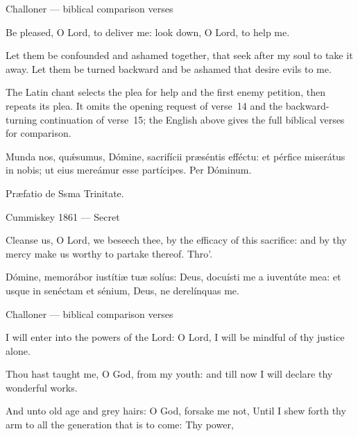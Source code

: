 \finishfulltextelement

\begin{fulltextenglish}{Challoner --- biblical comparison verses}

Be pleased, O Lord, to deliver me: look down, O Lord, to help me.

Let them be confounded and ashamed together, that seek after my soul to take it away. Let them be turned backward and be ashamed that desire evils to me.

\end{fulltextenglish}

The Latin chant selects the plea for help and the first enemy petition, then repeats its plea. It omits the opening request of verse~14 and the backward-turning continuation of verse~15; the English above gives the full biblical verses for comparison.



Munda nos, quǽsumus, Dómine, sacrifícii præséntis efféctu: et pérfice
miserátus in nobis; ut eius mereámur esse partícipes. Per Dóminum.

Præfatio de Ssma Trinitate.

\finishfulltextelement

\begin{fulltextenglish}{Cummiskey 1861 --- Secret}

Cleanse us, O Lord, we beseech thee, by the efficacy of this sacrifice: and by thy mercy make us worthy to partake thereof. Thro’.

\end{fulltextenglish}



Dómine, memorábor iustítiæ tuæ solíus: Deus, docuísti me a iuventúte mea:
et usque in senéctam et sénium, Deus, ne derelínquas me.

\finishfulltextelement

\begin{fulltextenglish}{Challoner --- biblical comparison verses}

I will enter into the powers of the Lord: O Lord, I will be mindful of thy justice alone.

Thou hast taught me, O God, from my youth: and till now I will declare thy wonderful works.

And unto old age and grey hairs: O God, forsake me not, Until I shew forth thy arm to all the generation that is to come: Thy power,

\end{fulltextenglish}


